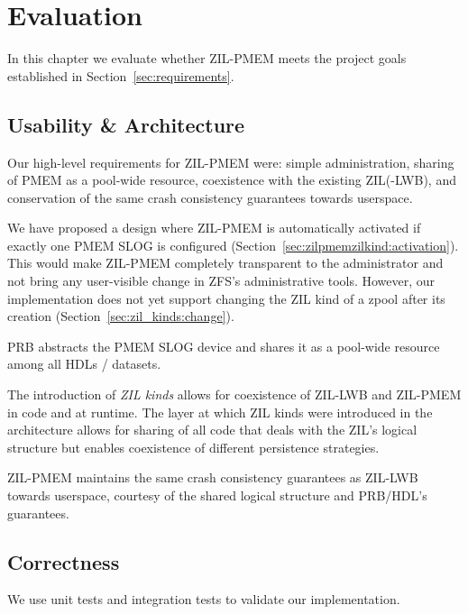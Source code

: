 \documentclass[12pt,a4paper,twoside]{book}
\begin{document}
\chapter{Evaluation}\label{ch:eval}
In this chapter we evaluate whether ZIL-PMEM meets the project goals established in Section~\ref{sec:requirements}.

\section{Usability \& Architecture}

Our high-level requirements for ZIL-PMEM were: simple administration, sharing of PMEM as a pool-wide resource, coexistence with the existing ZIL(-LWB), and conservation of the same crash consistency guarantees towards userspace.
\begin{description}[noitemsep]
    \item[Simple Administration] We have proposed a design where ZIL-PMEM is automatically activated if exactly one PMEM SLOG is configured (Section~\ref{sec:zilpmemzilkind:activation}).
        This would make ZIL-PMEM completely transparent to the administrator and not bring any user-visible change in ZFS's administrative tools.
        However, our implementation does not yet support changing the ZIL kind of a zpool after its creation (Section~\ref{sec:zil_kinds:change}).
    \item[Pooled Storage] PRB abstracts the PMEM SLOG device and shares it as a pool-wide resource among all HDLs / datasets.
    \item[Coexistence] The introduction of \textit{ZIL kinds} allows for coexistence of ZIL-LWB and ZIL-PMEM in code and at runtime.
        The layer at which ZIL kinds were introduced in the architecture allows for sharing of all code that deals with the ZIL's logical structure but enables coexistence of different persistence strategies.
    \item[Same Guarantees] ZIL-PMEM maintains the same crash consistency guarantees as ZIL-LWB towards userspace, courtesy of the shared logical structure and PRB/HDL's guarantees.
\end{description}

\section{Correctness}

We use unit tests and integration tests to validate our implementation.
\end{document}
